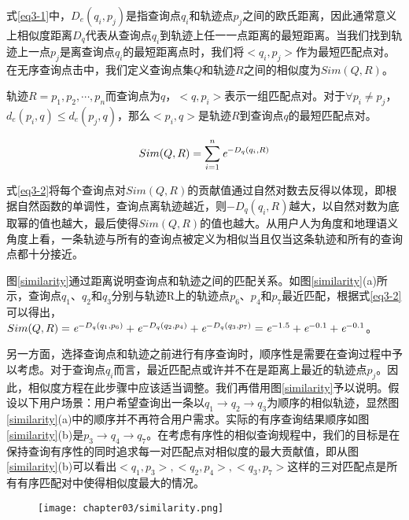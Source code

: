 式\ref{eq3-1}中，$D_{e}(q_{i}, p_{j})$是指查询点$q_{i}$和轨迹点$p_{j}$之间的欧氏距离，因此通常意义上相似度距离$D_{q}$代表从查询点$q_{i}$到轨迹上任一一点距离的最短距离。当我们找到轨迹上一点$p_{j}$是离查询点$q_{i}$的最短距离点时，我们将$<q_{i},p_{j}>$作为最短匹配点对。在无序查询点击中，我们定义查询点集$Q$和轨迹$R$之间的相似度为$Sim(Q,R)$。

\theoremstyle{definition}
\begin{definition}
	轨迹$R={p_{1}, p_{2}, \cdots, p_{n}}$而查询点为$q$，$<q, p_{i}>$表示一组匹配点对。对于$\forall p_{i} \neq p_{j}$， $d_{e}(p_{i}, q)\leq d_{e}(p_{j}, q)$，那么$<p_{i}, q>$是轨迹$R$到查询点$q$的最短匹配点对。
\end{definition}

\begin{equation}
	\label{eq3-2}
	Sim(Q,R) = \sum_{i=1}^{n} \emph{e}^{-D_{q}(q_{i}, R)}
\end{equation}

式\ref{eq3-2}将每个查询点对$Sim(Q,R)$的贡献值通过自然对数去反得以体现，即根据自然函数的单调性，查询点离轨迹越近，则$-D_{q}(q_{i}, R)$越大，以自然对数为底取幂的值也越大，最后使得$Sim(Q,R)$的值也越大。从用户人为角度和地理语义角度上看，一条轨迹与所有的查询点被定义为相似当且仅当这条轨迹和所有的查询点都十分接近。

图\ref{similarity}通过距离说明查询点和轨迹之间的匹配关系。如图\ref{similarity}(a)所示，查询点$q_{1}$、$q_{2}$和$q_{3}$分别与轨迹R上的轨迹点$p_{6}$、$p_{4}$和$p_{7}$最近匹配，根据式\ref{eq3-2}可以得出，$Sim(Q,R) = \emph{e}^{-D_{q}(q_{1}, p_{6})} + \emph{e}^{-D_{q}(q_{2}, p_{4})} + \emph{e}^{-D_{q}(q_{3}, p_{7})} = \emph{e}^{-1.5}+ \emph{e}^{-0.1} + \emph{e}^{-0.1}$。

另一方面，选择查询点和轨迹之前进行有序查询时，顺序性是需要在查询过程中予以考虑。对于查询点$q_{i}$而言，最近匹配点或许并不在是距离上最近的轨迹点$p_{j}$。因此，相似度方程在此步骤中应该适当调整。我们再借用图\ref{similarity}予以说明。假设以下用户场景：用户希望查询出一条以$q_{1} \rightarrow q_{2} \rightarrow q_{3}$为顺序的相似轨迹，显然图\ref{similarity}(a)中的顺序并不再符合用户需求。实际的有序查询结果顺序如图\ref{similarity}(b)是$p_{3} \rightarrow q_{4} \rightarrow q_{7}$。在考虑有序性的相似查询规程中，我们的目标是在保持查询有序性的同时追求每一对匹配点对相似度的最大贡献值，即从图\ref{similarity}(b)可以看出$<q_{1},p_{3}>, <q_{2},p_{4}>, <q_{3},p_{7}>$这样的三对匹配点是所有有序匹配对中使得相似度最大的情况。

\begin{figure}[!htp]
  \centering
  \texttt{[image: chapter03/similarity.png]}
\end{figure}

